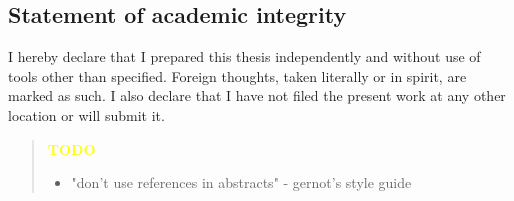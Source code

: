 \documentclass[a4paper, 10pt]{article}
\def \todo{\textbf{\textcolor{yellow}{TODO}}}
\begin{document}
\begin{enumerate}
\section*{Statement of academic integrity}
\label{sec:integrity}
I hereby declare that I prepared this thesis independently and without use of tools other than specified. Foreign thoughts, taken literally or in spirit, are marked as such. I also declare that I have not filed the present work at any other location or will submit it.

\pagebreak
\newpage \thispagestyle{empty} \mbox{}
\pagebreak

\begin{abstract}
\todo
\begin{itemize}
	\item "don't use references in abstracts" - gernot's style guide
\end{itemize}

\end{abstract}
\pagebreak
\newpage \thispagestyle{empty} \mbox{}
\pagebreak

\renewcommand{\contentsname}{Table of contents}
\tableofcontents

\pagebreak
\newpage \thispagestyle{empty} \mbox{}
\pagebreak


\end{enumerate}
\end{document}
